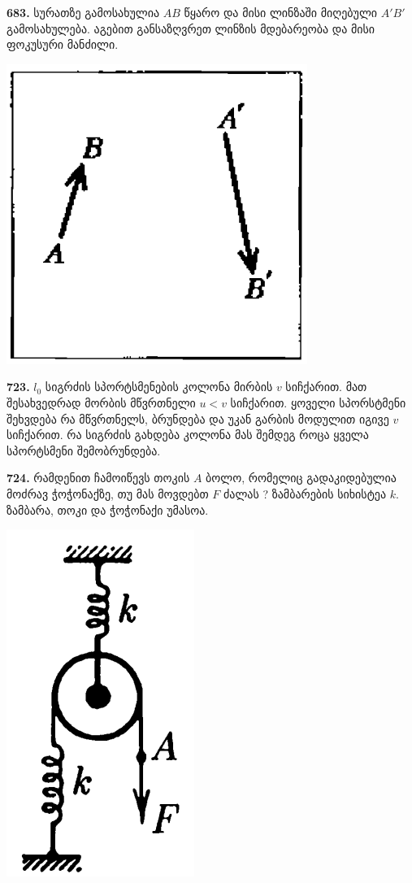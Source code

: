 \documentclass[12pt,a4paper,]{report}
\begin{document}
\textbf{683.} სურათზე გამოსახულია $AB$ წყარო და მისი ლინზაში მიღებული $A'B'$ გამოსახულება. აგებით განსაზღვრეთ ლინზის მდებარეობა და მისი ფოკუსური მანძილი. 
		\begin{center}
			\includegraphics[scale=0.5]{images/F683.png}
		\end{center}
	
\textbf{723.} $l_0$ სიგრძის სპორტსმენების კოლონა მირბის $v$ სიჩქარით. მათ შესახვედრად მორბის მწვრთნელი $u<v$ სიჩქარით. ყოველი სპორსტმენი შეხვდება რა მწვრთნელს, ბრუნდება და უკან გარბის მოდულით იგივე $v$ სიჩქარით. რა სიგრძის გახდება კოლონა მას შემდეგ როცა ყველა სპორტსმენი შემობრუნდება.
		
\textbf{724.} რამდენით ჩამოიწევს თოკის $A$ ბოლო, რომელიც გადაკიდებულია მოძრავ ჭოჭონაქზე, თუ მას მოვდებთ $F$ ძალას ? ზამბარების სიხისტეა $k$. ზამბარა, თოკი და ჭოჭონაქი უმასოა.
		\begin{center}
			\includegraphics[scale=0.3]{images/724.png}
		\end{center}
\end{document}
